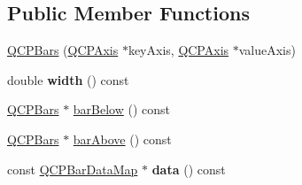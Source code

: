 \subsection*{Public Member Functions}
\begin{DoxyCompactItemize}
\item 
\hyperlink{classQCPBars_a64006999ad9dff308f40df41cef176ad}{Q\-C\-P\-Bars} (\hyperlink{classQCPAxis}{Q\-C\-P\-Axis} $\ast$key\-Axis, \hyperlink{classQCPAxis}{Q\-C\-P\-Axis} $\ast$value\-Axis)
\item 
\hypertarget{classQCPBars_a42798c38abd5f5db22bd45d77f429625}{double {\bfseries width} () const }\label{classQCPBars_a42798c38abd5f5db22bd45d77f429625}

\item 
\hyperlink{classQCPBars}{Q\-C\-P\-Bars} $\ast$ \hyperlink{classQCPBars_a2c46a686cbad95f180ca3c2e88263961}{bar\-Below} () const 
\item 
\hyperlink{classQCPBars}{Q\-C\-P\-Bars} $\ast$ \hyperlink{classQCPBars_a9ca48a6577586825d85bdc1fbf410803}{bar\-Above} () const 
\item 
\hypertarget{classQCPBars_a4938c4eb29e48d4f15037886bcd4082d}{const \hyperlink{qcustomplot_8h_aa846c77472cae93def9f1609d0c57191}{Q\-C\-P\-Bar\-Data\-Map} $\ast$ {\bfseries data} () const }\label{classQCPBars_a4938c4eb29e48d4f15037886bcd4082d}


\end{DoxyCompactItemize}
